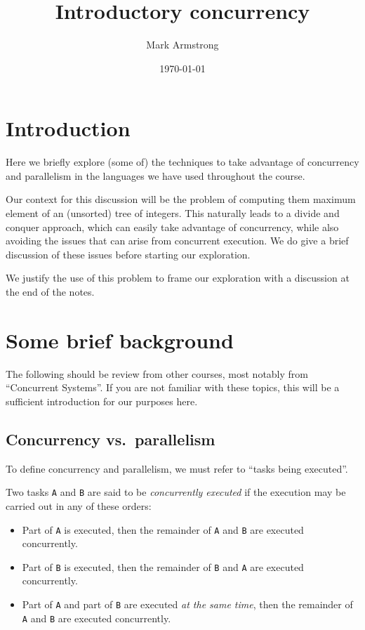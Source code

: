 \documentclass[11pt]{article}
\author{Mark Armstrong}
\date{\today}
\title{Introductory concurrency}
\begin{document}
\maketitle
\tableofcontents


\section{Introduction}
\label{sec:orgc205cad}
Here we briefly explore (some of) the techniques to take advantage
of concurrency and parallelism in the languages we have used
throughout the course.

Our context for this discussion will be the problem
of computing them maximum element of an (unsorted) tree of integers.
This naturally leads to a divide and conquer approach,
which can easily take advantage of concurrency,
while also avoiding the issues that can arise from concurrent execution.
We do give a brief discussion of these issues before
starting our exploration.

We justify the use of this problem to frame our exploration
with a discussion at the end of the notes.

\section{Some brief background}
\label{sec:org66b77d3}
The following should be review from other courses,
most notably from “Concurrent Systems”.
If you are not familiar with these topics,
this will be a sufficient introduction
for our purposes here.

\subsection{Concurrency vs. parallelism}
\label{sec:org972afc8}
To define concurrency and parallelism, we must refer to
“tasks being executed”.

Two tasks \texttt{A} and \texttt{B} are said to be \emph{concurrently executed} if
the execution may be carried out in any of these orders:
\begin{itemize}
\item Part of \texttt{A} is executed, then the remainder of \texttt{A} and \texttt{B} are
executed concurrently.
\item Part of \texttt{B} is executed, then the remainder of \texttt{B} and \texttt{A} are
executed concurrently.
\item Part of \texttt{A} and part of \texttt{B} are executed \emph{at the same time},
then the remainder of \texttt{A} and \texttt{B} are executed concurrently.
\end{itemize}
\end{document}
